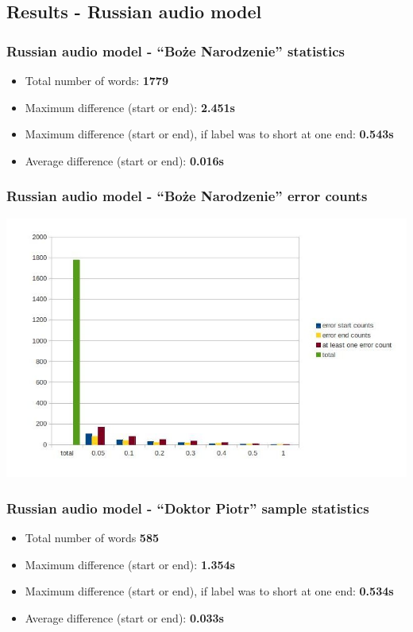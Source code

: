 \documentclass[]{beamer}
\begin{document}
\subsection{Results - Russian audio model}
\begin{frame}
    \frametitle{Russian audio model - “Boże Narodzenie” statistics}
    \begin{itemize}
        \item Total number of words:				\textbf{1779}
        \item Maximum difference (start or end): 			\textbf{2.451s}
        \item Maximum difference (start or end), if label was to short at one end: 			\textbf{0.543s}
        \item Average difference  (start or end):			\textbf{0.016s}
    \end{itemize}
\end{frame}
\begin{frame}
    \frametitle{Russian audio model - “Boże Narodzenie” error counts}
    \includegraphics[scale=0.37]{boze_narodzenie_word_russian_results.jpg}
\end{frame}
\begin{frame}
    \frametitle{Russian audio model - “Doktor Piotr” sample statistics}
    \begin{itemize}
        \item Total number of words				\textbf{585}
        \item Maximum difference (start or end): 			\textbf{1.354s}
        \item Maximum difference (start or end), if label was to short at one end: 			\textbf{0.534s}
        \item Average difference  (start or end):			\textbf{0.033s}
    \end{itemize}
\end{frame}
\end{document}
